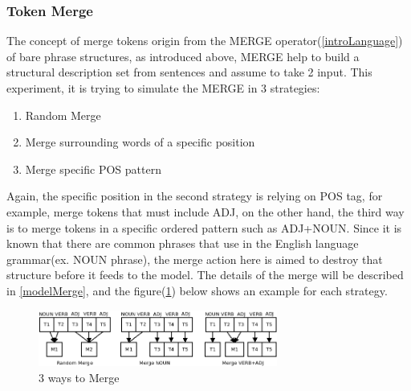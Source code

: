 \documentclass[12pt]{article}
\begin{document}
\subsubsection{Token Merge} \label{incompmerge}
The concept of merge tokens origin from the MERGE operator(\ref{introLanguage}) of bare phrase structures, as introduced above, MERGE help to build a structural description set from sentences and assume to take 2 input. This experiment, it is trying to simulate the MERGE in 3 strategies:
\begin{center}
\begin{enumerate}
    \item Random Merge
    \item Merge surrounding words of a specific position
    \item Merge specific POS pattern
\end{enumerate}
\end{center}
Again, the specific position in the second strategy is relying on POS tag, for example, merge tokens that must include ADJ, on the other hand, the third way is to merge tokens in a specific ordered pattern such as ADJ+NOUN. Since it is known that there are common phrases that use in the English language grammar(ex. NOUN phrase), the merge action here is aimed to destroy that structure before it feeds to the model. The details of the merge will be described in \ref{modelMerge}, and the figure(\ref{fig:3waysonmerge}) below shows an example for each strategy.

\begin{figure} [!h]
\begin{center}
\includegraphics[width=0.7\textwidth]{figures/merge.png}
\caption{3 ways to Merge}
\label{fig:3waysonmerge}
\end{center}
\end{figure}
\end{document}
